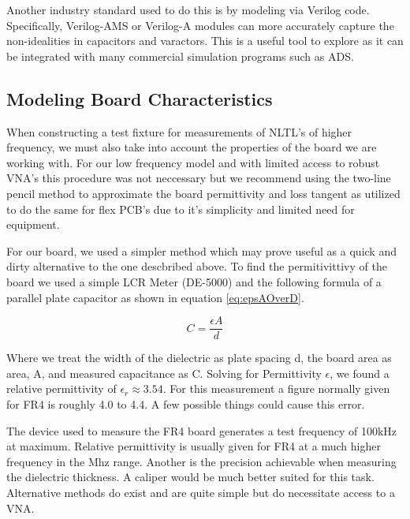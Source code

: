 \documentclass[journal]{IEEEtran} \usepackage[english]{babel}
\begin{document}
    Another industry standard used to do this is by modeling via Verilog code.
    Specifically, Verilog-AMS or Verilog-A modules can more accurately capture
    the non-idealities in capacitors and varactors. This is a useful tool to
    explore as it can be integrated with many commercial simulation programs
    such as ADS.
    
    
    
   

\subsection{Modeling Board Characteristics}

When constructing a test fixture for measurements of NLTL's of higher frequency,
we must also take into account the properties of the board we are working with.
For our low frequency model and with limited access to robust VNA's this
procedure was not neccessary but we recommend using the two-line pencil
method to approximate the board permittivity and loss tangent as utilized to do
the same for flex PCB's due to it's simplicity and limited need for
equipment\cite{TwoLine}.

For our board, we used a simpler method which may prove useful as a quick and
dirty alternative to the one descbribed above. To find the permitivittivy of the
board we used a simple LCR Meter (DE-5000) and the following formula of a
parallel plate capacitor as shown in equation \ref{eq:epsAOverD}.



\begin{equation}\label{eq:epsAOverD}
	C =\frac{ \epsilon{}A }{d}
\end{equation}

Where we treat the width of the dielectric as plate spacing d, the board area
as area, A, and measured capacitance as C. Solving for Permittivity
$\epsilon$, we found a relative permittivity of $\epsilon_{r}\approx 3.54$.
For this measurement a figure normally given for FR4 is roughly 4.0 to 4.4. A
few possible things could cause this error. 

The device used to measure the FR4 board generates a test frequency of 100kHz at
maximum. Relative permittivity is usually given for FR4 at a much higher
frequency in the Mhz range. Another is the precision achievable when measuring
the dielectric thickness. A caliper would be much better suited for this task.
Alternative methods do exist and are quite simple but do necessitate access to a
VNA\cite{SimpleRelative}.
\end{document}

